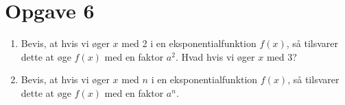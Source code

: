 \section*{Opgave 6}
\begin{enumerate}[label=\roman*)]
\item Bevis, at hvis vi øger $x$ med 2 i en eksponentialfunktion $f(x)$, så tilsvarer dette at øge $f(x)$ med en faktor $a^2$. Hvad hvis vi øger $x$ med $3$?
\item Bevis, at hvis vi øger $x$ med $n$ i en eksponentialfunktion $f(x)$, så tilsvarer dette at øge $f(x)$ med en faktor $a^n$.
\end{enumerate}